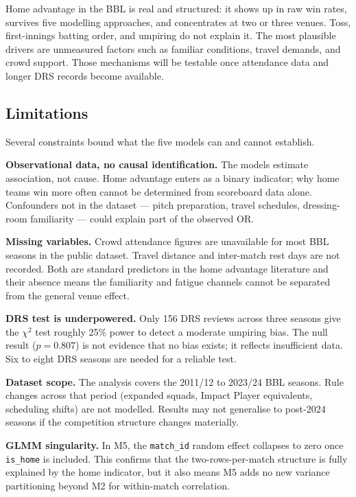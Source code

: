 \documentclass[12pt,a4paper]{article}
\begin{document}
Home advantage in the BBL is real and structured: it shows up in raw win rates, survives
five modelling approaches, and concentrates at two or three venues. Toss, first-innings
batting order, and umpiring do not explain it. The most plausible drivers are unmeasured
factors such as familiar conditions, travel demands, and crowd support. Those mechanisms
will be testable once attendance data and longer DRS records become available.

\subsection{Limitations}

Several constraints bound what the five models can and cannot establish.

\textbf{Observational data, no causal identification.} The models estimate association, not
cause. Home advantage enters as a binary indicator; why home teams win more often cannot be
determined from scoreboard data alone. Confounders not in the dataset — pitch preparation,
travel schedules, dressing-room familiarity — could explain part of the observed OR.

\textbf{Missing variables.} Crowd attendance figures are unavailable for most BBL seasons in
the public dataset. Travel distance and inter-match rest days are not recorded. Both are
standard predictors in the home advantage literature \cite{courneya1992} and their absence
means the familiarity and fatigue channels cannot be separated from the general venue effect.

\textbf{DRS test is underpowered.} Only 156 DRS reviews across three seasons give the
$\chi^2$ test roughly 25\% power to detect a moderate umpiring bias. The null result ($p =
0.807$) is not evidence that no bias exists; it reflects insufficient data. Six to eight DRS
seasons are needed for a reliable test.

\textbf{Dataset scope.} The analysis covers the 2011/12 to 2023/24 BBL seasons. Rule changes
across that period (expanded squads, Impact Player equivalents, scheduling shifts) are not
modelled. Results may not generalise to post-2024 seasons if the competition structure
changes materially.

\textbf{GLMM singularity.} In M5, the \texttt{match\_id} random effect collapses to zero
once \texttt{is\_home} is included. This confirms that the two-rows-per-match structure
is fully explained by the home indicator, but it also means M5 adds no new variance
partitioning beyond M2 for within-match correlation.
\end{document}
